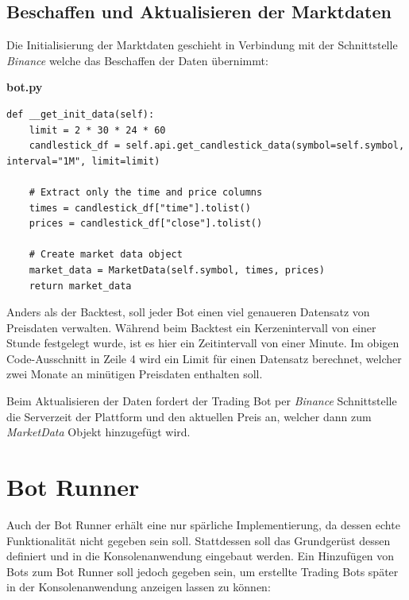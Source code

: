 \documentclass[oneside]{ausarbeitung}
\begin{document}
\subsection{Beschaffen und Aktualisieren der Marktdaten}
\label{sub:beschaffen_und_aktualisieren_der_marktdaten}

Die Initialisierung der Marktdaten geschieht in Verbindung mit der Schnittstelle \textit{Binance} welche das Beschaffen der Daten übernimmt:

\lstset{language=Python}
\lstset{frame=lines}
\lstset{basicstyle=\footnotesize}
\textbf{bot.py}
\begin{lstlisting}
def __get_init_data(self):
	limit = 2 * 30 * 24 * 60
	candlestick_df = self.api.get_candlestick_data(symbol=self.symbol, interval="1M", limit=limit)

	# Extract only the time and price columns
	times = candlestick_df["time"].tolist()
	prices = candlestick_df["close"].tolist()

	# Create market data object
	market_data = MarketData(self.symbol, times, prices)
	return market_data
\end{lstlisting}

Anders als der Backtest, soll jeder Bot einen viel genaueren Datensatz von Preisdaten verwalten. Während beim Backtest ein Kerzenintervall von einer Stunde festgelegt wurde, ist es hier ein Zeitintervall von einer Minute. Im obigen 
Code-Ausschnitt in Zeile 4 wird ein Limit für einen Datensatz berechnet, 
welcher zwei Monate an minütigen Preisdaten enthalten soll.

Beim Aktualisieren der Daten fordert der Trading Bot per \textit{Binance} Schnittstelle die Serverzeit der Plattform und den aktuellen Preis an, welcher dann zum \textit{MarketData} Objekt hinzugefügt wird.


\section{Bot Runner}
\label{sec:bot_runner}

Auch der Bot Runner erhält eine nur spärliche Implementierung, da dessen echte Funktionalität nicht gegeben sein soll. Stattdessen soll das Grundgerüst dessen definiert und in die Konsolenanwendung eingebaut werden. Ein Hinzufügen von Bots zum Bot Runner soll jedoch gegeben sein, um erstellte Trading Bots später in der Konsolenanwendung anzeigen lassen zu können:
\end{document}
